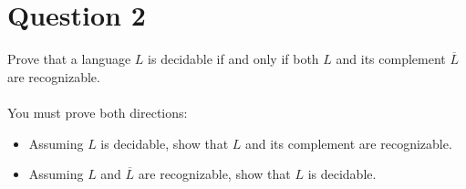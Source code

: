 \documentclass{article}
\begin{document}











\section{Question 2}
Prove that a language \( L \) is decidable if and only if both \( L \) and its complement \( \overline{L} \) are recognizable.
\\
\\
You must prove both directions:
\begin{itemize}
    \item Assuming \( L \) is decidable, show that \( L \) and its complement are recognizable.
    \item Assuming \( L \) and \( \overline{L} \) are recognizable, show that \( L \) is decidable.
\end{itemize}
\end{document}
